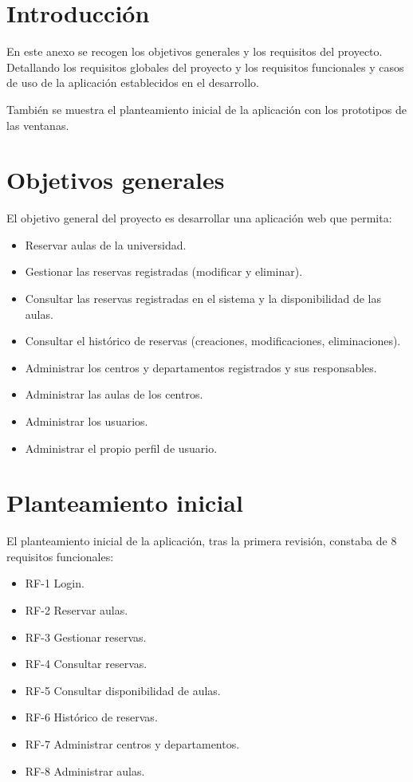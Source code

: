 
\section{Introducción}

En este anexo se recogen los objetivos generales y los requisitos del proyecto. Detallando los requisitos globales del proyecto y los requisitos funcionales y casos de uso de la aplicación establecidos en el desarrollo.

También se muestra el planteamiento inicial de la aplicación con los prototipos de las ventanas.

\section{Objetivos generales}
El objetivo general del proyecto es desarrollar una aplicación web que permita:
\begin{itemize}
	\item Reservar aulas de la universidad.
	\item Gestionar las reservas registradas (modificar y eliminar). 
	\item Consultar las reservas registradas en el sistema y la disponibilidad de las aulas.
	\item Consultar el histórico de reservas (creaciones, modificaciones, eliminaciones).
	\item Administrar los centros y departamentos registrados y sus responsables.
	\item Administrar las aulas de los centros.
	\item Administrar los usuarios.
	\item Administrar el propio perfil de usuario.
\end{itemize}

\section{Planteamiento inicial}
El planteamiento inicial de la aplicación, tras la primera revisión, constaba de 8 requisitos funcionales:
\begin{itemize}
	\item RF-1 Login.
	\item RF-2 Reservar aulas. 
	\item RF-3 Gestionar reservas.
	\item RF-4 Consultar reservas.
	\item RF-5 Consultar disponibilidad de aulas.
	\item RF-6 Histórico de reservas.
	\item RF-7 Administrar centros y departamentos.
	\item RF-8 Administrar aulas.
\end{itemize}

